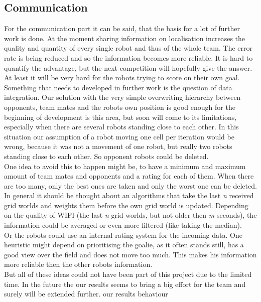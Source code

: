 \documentclass[lnicst,a4paper]{svmultln}
\begin{document}
\subsection{Communication}
\label{sec:results_communication}
For the communication part it can be said, that the basis for a lot of further work is done. At the moment sharing information on localisation increases the quality and quantity of every single robot and thus of the whole team. The error rate is being reduced and so the information becomes more reliable. It is hard to quantify the advantage, but the next competition will hopefully give the answer. At least it will be very hard for the robots trying to score on their own goal.
\\
Something that needs to developed in further work is the question of data integration. Our solution with the very simple overwriting hierarchy between opponents, team mates and the robots own position is good enough for the beginning of development is this area, but soon will come to its limitations, especially when there are several robots standing close to each other. In this situation our assumption of a robot moving one cell per iteration would be wrong, because it was not a movement of one robot, but really two robots standing close to each other. So opponent robots could be deleted. 
\\
One idea to avoid this to happen might be, to have a minimum and maximum amount of team mates and opponents and a rating for each of them. When there are too many, only the best ones are taken and only the worst one can be deleted.
\\
In general it should be thought about an algorithms that take the last \textit{n} received grid worlds and weights them before the own grid world is updated.  Depending on the quality of WIFI (the last \textit{n} grid worlds, but not older then \textit{m} seconds), the information could be averaged or even more filtered (like taking the median). 
\\
Or the robots could use an internal rating system for the incoming data. One heuristic might depend on prioritising the goalie, as it often stands still, has a good view over the field and does not move too much. This makes his information more reliable then the other robots information. 
\\
But all of these ideas could not have been part of this project due to the limited time. In the future the our results seems to bring a big effort for the team and surely will be extended further.
our results
behaviour
\end{document}
